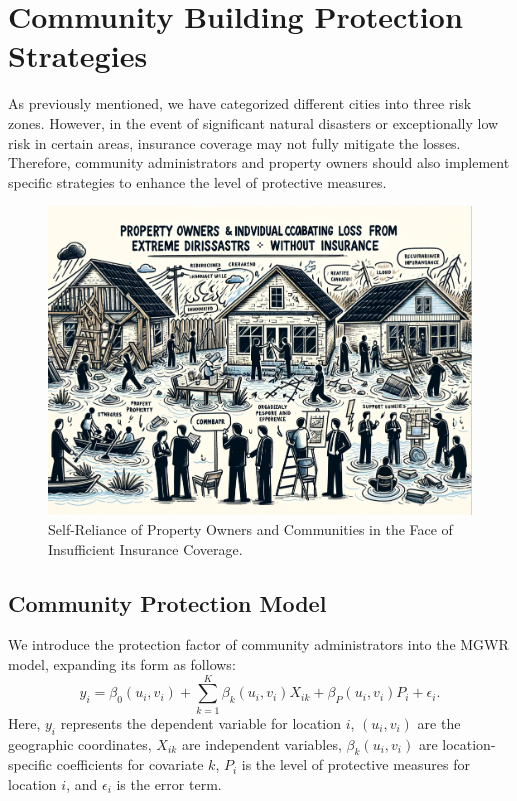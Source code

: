 \documentclass[12pt]{article}
\begin{document}
\section{Community Building Protection Strategies}
As previously mentioned, we have categorized different cities into three risk zones. However, in the event of significant natural disasters or exceptionally low risk in certain areas, insurance coverage may not fully mitigate the losses. Therefore, community administrators and property owners should also implement specific strategies to enhance the level of protective measures.

\begin{figure}[htb]
    \centering
    \includegraphics[width=0.8\linewidth]{figure/without.png}
    \caption{Self-Reliance of Property Owners and Communities in the Face of Insufficient Insurance Coverage.}
\end{figure}
\subsection{Community Protection Model}
We introduce the protection factor of community administrators into the MGWR model, expanding its form as follows:
\begin{equation}
    y_i = \beta_0(u_i, v_i) + \sum_{k=1}^{K} \beta_k(u_i, v_i)X_{ik} + \beta_{P}(u_i, v_i)P_i + \epsilon_i.
\end{equation}
Here, \(y_i\) represents the dependent variable for location \(i\), \((u_i, v_i)\) are the geographic coordinates, \(X_{ik}\) are independent variables, \(\beta_k(u_i, v_i)\) are location-specific coefficients for covariate \(k\), \(P_i\) is the level of protective measures for location \(i\), and \(\epsilon_i\) is the error term.
\end{document}
